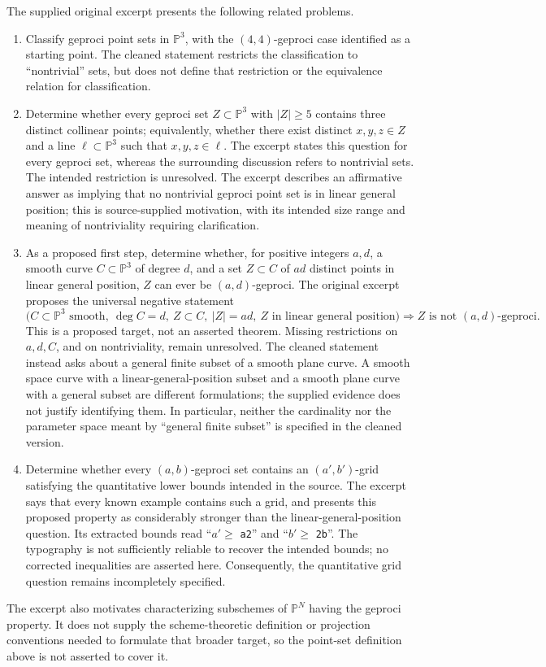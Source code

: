 \documentclass[11pt]{article}
\newcommand{\PP}{\mathbb{P}}
\begin{document}
The supplied original excerpt presents the following related problems.
\begin{enumerate}
\item Classify geproci point sets in \(\PP^3\), with the \((4,4)\)-geproci case identified as a starting point. The cleaned statement restricts the classification to ``nontrivial'' sets, but does not define that restriction or the equivalence relation for classification.
\item Determine whether every geproci set \(Z\subset\PP^3\) with \(|Z|\geq5\) contains three distinct collinear points; equivalently, whether there exist distinct \(x,y,z\in Z\) and a line \(\ell\subset\PP^3\) such that \(x,y,z\in\ell\). The excerpt states this question for every geproci set, whereas the surrounding discussion refers to nontrivial sets. The intended restriction is unresolved. The excerpt describes an affirmative answer as implying that no nontrivial geproci point set is in linear general position; this is source-supplied motivation, with its intended size range and meaning of nontriviality requiring clarification.
\item As a proposed first step, determine whether, for positive integers \(a,d\), a smooth curve \(C\subset\PP^3\) of degree \(d\), and a set \(Z\subset C\) of \(ad\) distinct points in linear general position, \(Z\) can ever be \((a,d)\)-geproci. The original excerpt proposes the universal negative statement
\[
\bigl(C\subset\PP^3\text{ smooth},\ \deg C=d,\ Z\subset C,\ |Z|=ad,\ Z\text{ in linear general position}\bigr)
\Longrightarrow Z\text{ is not }(a,d)\text{-geproci}.
\]
This is a proposed target, not an asserted theorem. Missing restrictions on \(a,d,C\), and on nontriviality, remain unresolved. The cleaned statement instead asks about a general finite subset of a smooth plane curve. A smooth space curve with a linear-general-position subset and a smooth plane curve with a general subset are different formulations; the supplied evidence does not justify identifying them. In particular, neither the cardinality nor the parameter space meant by ``general finite subset'' is specified in the cleaned version.
\item Determine whether every \((a,b)\)-geproci set contains an \((a',b')\)-grid satisfying the quantitative lower bounds intended in the source. The excerpt says that every known example contains such a grid, and presents this proposed property as considerably stronger than the linear-general-position question. Its extracted bounds read ``\(a'\geq\) \texttt{a2}'' and ``\(b'\geq\) \texttt{2b}''. The typography is not sufficiently reliable to recover the intended bounds; no corrected inequalities are asserted here. Consequently, the quantitative grid question remains incompletely specified.
\end{enumerate}
The excerpt also motivates characterizing subschemes of \(\PP^N\) having the geproci property. It does not supply the scheme-theoretic definition or projection conventions needed to formulate that broader target, so the point-set definition above is not asserted to cover it.
\end{document}

